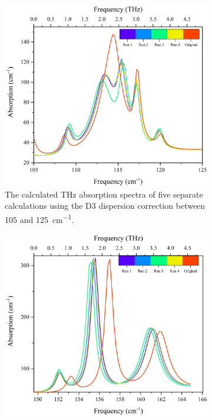 \begin{figure}
\centering
\begin{subfigure}{\textwidth}
    \centering
    \includegraphics[scale=0.5]{Figures/Spectra/Sim Study/SimStudG2.png}
    \caption{The calculated THz absorption spectra of five separate calculations using the D3 dispersion correction between 105 and \SI{125}{cm^{-1}}.}
    \label{fig:simstudy2}
\end{subfigure}
\begin{subfigure}{\textwidth}
    \centering
    \includegraphics[scale=0.5]{Figures/Spectra/Sim Study/SimStudG3.png}

\end{subfigure}
\end{figure}
